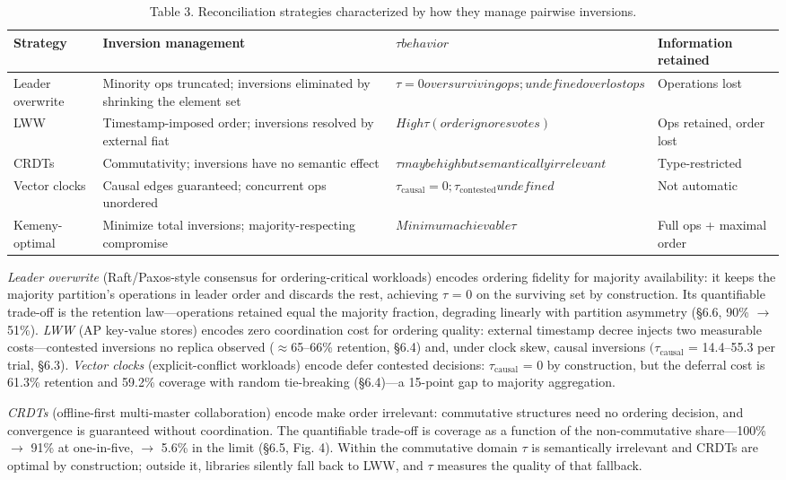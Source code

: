 \documentclass[journal]{IEEEtran}
\begin{document}
\begin{table}[t]
\centering
\caption{Table 3. Reconciliation strategies characterized by how they manage pairwise inversions.}
\begin{tabular}{llll}
\hline
Strategy & Inversion management & $\tau behavior$ & Information retained \\
\hline
Leader overwrite & Minority ops truncated; inversions eliminated by shrinking the element set & $\tau = 0 over surviving ops; undefined over lost ops$ & Operations lost \\
LWW & Timestamp-imposed order; inversions resolved by external fiat & $High \tau (order ignores votes)$ & Ops retained, order lost \\
CRDTs & Commutativity; inversions have no semantic effect & $\tau may be high but semantically irrelevant$ & Type-restricted \\
Vector clocks & Causal edges guaranteed; concurrent ops unordered & $\tau_{\mathrm{causal}} = 0; \tau_{\mathrm{contested}} undefined$ & Not automatic \\
Kemeny-optimal & Minimize total inversions; majority-respecting compromise & $Minimum achievable \tau$ & Full ops + maximal order \\
\hline
\end{tabular}
\end{table}

\emph{Leader overwrite} (Raft/Paxos-style consensus for ordering-critical workloads) encodes ordering fidelity for majority availability: it keeps the majority partition's operations in leader order and discards the rest, achieving $\tau$ = 0 on the surviving set by construction. Its quantifiable trade-off is the retention law—operations retained equal the majority fraction, degrading linearly with partition asymmetry (§6.6, 90\% $\rightarrow$ 51\%). \emph{LWW} (AP key-value stores) encodes zero coordination cost for ordering quality: external timestamp decree injects two measurable costs—contested inversions no replica observed ($\approx$65–66\% retention, §6.4) and, under clock skew, causal inversions $(\tau_{\mathrm{causal}}$ = 14.4–55.3 per trial, §6.3). \emph{Vector clocks} (explicit-conflict workloads) encode defer contested decisions: $\tau_{\mathrm{causal}}$ = 0 by construction, but the deferral cost is 61.3\% retention and 59.2\% coverage with random tie-breaking (§6.4)—a 15-point gap to majority aggregation.

\emph{CRDTs} (offline-first multi-master collaboration) encode make order irrelevant: commutative structures need no ordering decision, and convergence is guaranteed without coordination. The quantifiable trade-off is coverage as a function of the non-commutative share—100\% $\rightarrow$ 91\% at one-in-five, $\rightarrow$ 5.6\% in the limit (§6.5, Fig. 4). Within the commutative domain $\tau$ is semantically irrelevant and CRDTs are optimal by construction; outside it, libraries silently fall back to LWW, and $\tau$ measures the quality of that fallback.
\end{document}
